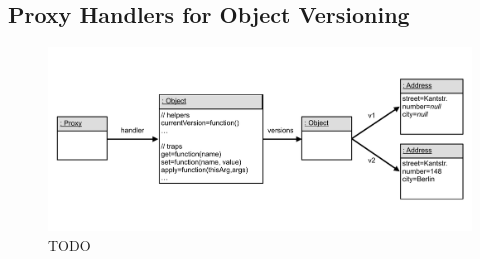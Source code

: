 \subsection{Proxy Handlers for Object Versioning}


\begin{figure}[h]
    \centering
    \includegraphics[width=\textwidth]{figures/5_implementation/2_versioningProxy.pdf}
    \caption{TODO}
    \label{fig:VersioningProxy}
\end{figure}



    
    
    





